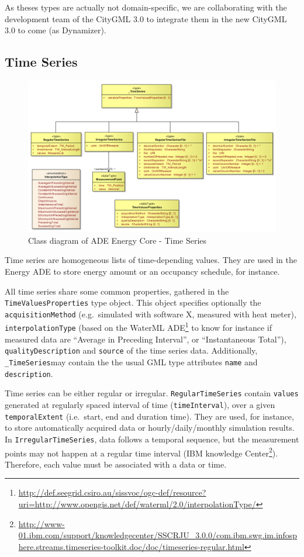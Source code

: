 \documentclass[a4paper,12pt]{article}
\renewcommand{\href}[2]{#2\footnote{\url{#1}}}
\begin{document}
As theses types are actually not domain-specific, we are collaborating
with the development team of the CityGML 3.0 to integrate them in the
new CityGML 3.0 to come (as Dynamizer).

\subsection{Time Series}\label{time-series}

\begin{figure}[htbp]
\centering
\includegraphics{fig/class_time.png}
\caption{Class diagram of ADE Energy Core - Time Series}
\end{figure}

Time series are homogeneous lists of time-depending values. They are
used in the Energy ADE to store energy amount or an occupancy schedule,
for instance.

All time series share some common properties, gathered in the
\lstinline!TimeValuesProperties! type object. This object specifies
optionally the \lstinline!acquisitionMethod! (e.g.~simulated with
software X, measured with heat meter), \lstinline!interpolationType!
(based on the
\href{http://def.seegrid.csiro.au/sissvoc/ogc-def/resource?uri=http://www.opengis.net/def/waterml/2.0/interpolationType/}{WaterML
ADE} to know for instance if measured data are ``Average in Preceding
Interval'', or ``Instantaneous Total''), \lstinline!qualityDescription!
and \lstinline!source! of the time series data. Additionally,
\lstinline!_TimeSeries!may contain the the usual GML type attributes
\lstinline!name! and \lstinline!description!.

Time series can be either regular or irregular.
\lstinline!RegularTimeSeries! contain \lstinline!values! generated at
regularly spaced interval of time (\lstinline!timeInterval!), over a
given \lstinline!temporalExtent! (i.e.~start, end and duration time).
They are used, for instance, to store automatically acquired data or
hourly/daily/monthly simulation results. In
\lstinline!IrregularTimeSeries!, data follows a temporal sequence, but
the measurement points may not happen at a regular time interval
(\href{http://www-01.ibm.com/support/knowledgecenter/SSCRJU_3.0.0/com.ibm.swg.im.infosphere.streams.timeseries-toolkit.doc/doc/timeseries-regular.html}{IBM
knowledge Center}). Therefore, each value must be associated with a data
or time.
\end{document}

